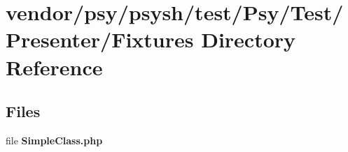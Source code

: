 \section{vendor/psy/psysh/test/\+Psy/\+Test/\+Presenter/\+Fixtures Directory Reference}
\label{dir_fd04d9843482d42bad0e94eebd2f6fe9}
\subsection*{Files}
\begin{DoxyCompactItemize}
\item 
file {\bf Simple\+Class.\+php}
\end{DoxyCompactItemize}
